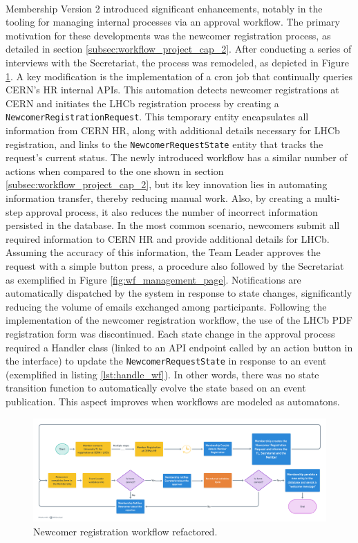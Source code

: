 \paragraph{}Membership Version 2 introduced significant enhancements, notably in the tooling for managing internal processes via an approval workflow. The primary motivation for these developments was the newcomer registration process, as detailed in section \ref{subsec:workflow_project_cap_2}. After conducting a series of interviews with the Secretariat, the process was remodeled, as depicted in Figure \ref{fig:newcomer_wf_refactor}. A key modification is the implementation of a cron job that continually queries CERN's HR internal APIs. This automation detects newcomer registrations at CERN and initiates the LHCb registration process by creating a \verb|NewcomerRegistrationRequest|. This temporary entity encapsulates all information from CERN HR, along with additional details necessary for LHCb registration, and links to the \verb|NewcomerRequestState| entity that tracks the request's current status. The newly introduced workflow has a similar number of actions when compared to the one shown in section \ref{subsec:workflow_project_cap_2}, but its key innovation lies in automating information transfer, thereby reducing manual work. Also, by creating a multi-step approval process, it also reduces the number of incorrect information persisted in the database. In the most common scenario, newcomers submit all required information to CERN HR and provide additional details for LHCb. Assuming the accuracy of this information, the Team Leader approves the request with a simple button press, a procedure also followed by the Secretariat as exemplified in Figure \ref{fig:wf_management_page}. Notifications are automatically dispatched by the system in response to state changes, significantly reducing the volume of emails exchanged among participants. Following the implementation of the newcomer registration workflow, the use of the LHCb PDF registration form was discontinued. Each state change in the approval process required a Handler class (linked to an API endpoint called by an action button in the interface) to update the \verb|NewcomerRequestState| in response to an event (exemplified in listing \ref{lst:handle_wf}). In other words, there was no state transition function to automatically evolve the state based on an event publication. This aspect improves when workflows are modeled as automatons.

\begin{figure}[H]
    \centering
    \includegraphics[width=1\linewidth]{figuras/newcomer_wf_refactor_2.png}
    \caption{Newcomer registration workflow refactored.}
    \label{fig:newcomer_wf_refactor}
\end{figure}

